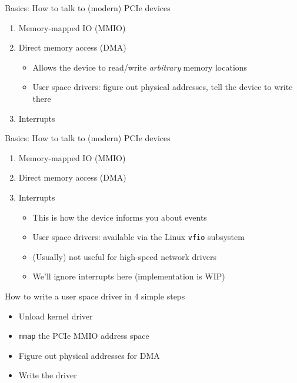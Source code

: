 \documentclass[NET,english,aspectratio=169,notitleframe]{tumbeamer}
\begin{document}
\begin{frame}{Basics: How to talk to (modern) PCIe devices}
\begin{enumerate}
\item[\color{TUMLightGray}1.] {\color{TUMLightGray} Memory-mapped IO (MMIO)}
\item[2.] Direct memory access (DMA)
\begin{itemize}
\item Allows the device to read/write \emph{arbitrary} memory locations
\item User space drivers: figure out physical addresses, tell the device to write there
\end{itemize}
\item[\color{TUMLightGray}3.] {\color{TUMLightGray}  Interrupts}
\end{enumerate}
\end{frame}

\begin{frame}{Basics: How to talk to (modern) PCIe devices}
\begin{enumerate}
\item[\color{TUMLightGray}1.] {\color{TUMLightGray} Memory-mapped IO (MMIO)}
\item[\color{TUMLightGray}2.] {\color{TUMLightGray} Direct memory access (DMA)}
\item[3.] Interrupts
\begin{itemize}
\item This is how the device informs you about events
\item User space drivers: available via the Linux \texttt{vfio} subsystem
\item (Usually) not useful for high-speed network drivers 
\item We'll ignore interrupts here (implementation is WIP)
\end{itemize}
\end{enumerate}
\end{frame}


\begin{frame}{How to write a user space driver in 4 simple steps}
\begin{itemize}
\item[1.] Unload kernel driver
\item[2.] \texttt{mmap} the PCIe MMIO address space
\item[3.] Figure out physical addresses for DMA
\item[4.] Write the driver
\end{itemize}
\end{frame}
\end{document}
